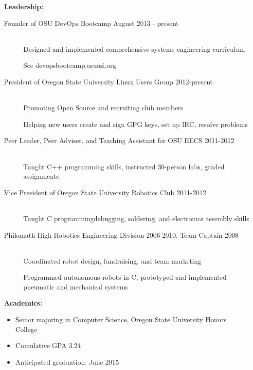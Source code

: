 \documentclass[11pt]{article}
\begin{document}
{\Large \bf Leadership:}
\begin{description}
    \item[Founder of OSU DevOps Bootcamp
        \hfill August 2013 - present]
        \hfill \\
        Designed and implemented comprehensive systems engineering curriculum

        See devopsbootcamp.osuosl.org

    \item[President of Oregon State University Linux Users Group
        \hfill 2012-present]
        \hfill \\
        Promoting Open Source and recruiting club members

        Helping new users create and sign GPG keys, set up IRC, resolve problems

   \item[Peer Leader, Peer Adviser, and Teaching Assistant for OSU EECS
        \hfill 2011-2012]
        \hfill \\ 
        Taught C++ programming skills, instructed 30-person labs, graded 
        assignments
        
    \item[Vice President of Oregon State University Robotics Club
        \hfill 2011-2012]
        \hfill \\
        Taught C programming\/debugging, soldering, and electronics assembly skills

    \item[Philomath High Robotics Engineering Division
        \hfill 2006-2010, Team Captain 2008]
        \hfill \\
        Coordinated robot design, fundraising, and team marketing

        Programmed autonomous robots in C, prototyped and implemented
        pneumatic and mechanical systems        

\end{description}

\smallskip
\hrulefill
\bigskip

{\Large \bf Academics:}
\begin{itemize}
    \item Senior majoring in Computer Science, Oregon State University 
          Honors College

    \item Cumulative GPA 3.24

    \item Anticipated graduation: June 2015

\end{itemize}
\end{document}
